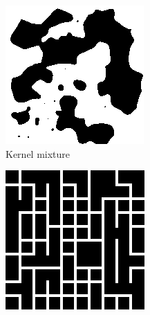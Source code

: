 \documentclass[letterpaper]{article}
\begin{document}
\begin{figure}
\begin{subfigure}[b]{0.2\textwidth}
        \includegraphics[width=\textwidth]{expMixture}
        \caption{Kernel mixture}
        \label{fig:mixture}
    \end{subfigure}
    \begin{subfigure}[b]{0.2\textwidth}
        \includegraphics[width=\textwidth]{percolation}

\end{subfigure}
\end{figure}
\end{document}
